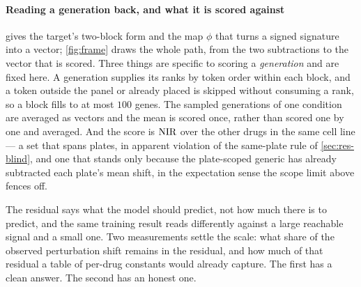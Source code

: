   \paragraph{Reading a generation back, and what it is scored against}
   gives the target's two-block form and the map $\phi$
  that turns a signed signature into a vector; \cref{fig:frame} draws the whole path,
  from the two subtractions to the vector that is scored. Three things are specific to
  scoring a \emph{generation} and are fixed here. A generation supplies its ranks by
  token order within each block, and a token outside the panel or already placed is
  skipped without consuming a rank, so a block fills to at most $100$ genes. The
  sampled generations of one condition are averaged as vectors and the mean is scored
  once, rather than scored one by one and averaged. And the score is $\textrm{NIR}$ over the
  other drugs in the same cell line --- a set that spans plates, in apparent violation
  of the same-plate rule of \cref{sec:res-blind}, and one that stands only because the
  plate-scoped generic has already subtracted each plate's mean shift, in the
  expectation sense the scope limit above fences off.
  
  
\label{sec:methods-vardecomp}

\begin{question}[5]
The residual says what the model should predict, not how much there is to
predict, and the same training result reads differently against a large reachable
signal and a small one. Two measurements settle the scale: what share of the
observed perturbation shift remains in the residual, and how much of that
residual a table of per-drug constants would already capture. The first has a clean answer. The
second has an honest one.
\end{question}

